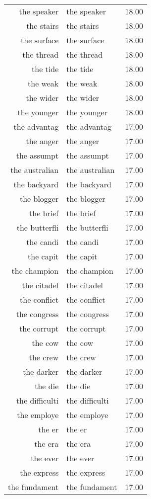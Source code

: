 \begin{table}[ht]
\begin{tabular}{rlr}
  the speaker & the speaker & 18.00 \\ 
  the stairs & the stairs & 18.00 \\ 
  the surface & the surface & 18.00 \\ 
  the thread & the thread & 18.00 \\ 
  the tide & the tide & 18.00 \\ 
  the weak & the weak & 18.00 \\ 
  the wider & the wider & 18.00 \\ 
  the younger & the younger & 18.00 \\ 
  the advantag & the advantag & 17.00 \\ 
  the anger & the anger & 17.00 \\ 
  the assumpt & the assumpt & 17.00 \\ 
  the australian & the australian & 17.00 \\ 
  the backyard & the backyard & 17.00 \\ 
  the blogger & the blogger & 17.00 \\ 
  the brief & the brief & 17.00 \\ 
  the butterfli & the butterfli & 17.00 \\ 
  the candi & the candi & 17.00 \\ 
  the capit & the capit & 17.00 \\ 
  the champion & the champion & 17.00 \\ 
  the citadel & the citadel & 17.00 \\ 
  the conflict & the conflict & 17.00 \\ 
  the congress & the congress & 17.00 \\ 
  the corrupt & the corrupt & 17.00 \\ 
  the cow & the cow & 17.00 \\ 
  the crew & the crew & 17.00 \\ 
  the darker & the darker & 17.00 \\ 
  the die & the die & 17.00 \\ 
  the difficulti & the difficulti & 17.00 \\ 
  the employe & the employe & 17.00 \\ 
  the er & the er & 17.00 \\ 
  the era & the era & 17.00 \\ 
  the ever & the ever & 17.00 \\ 
  the express & the express & 17.00 \\ 
  the fundament & the fundament & 17.00 \\ 

\end{tabular}
\end{table}
